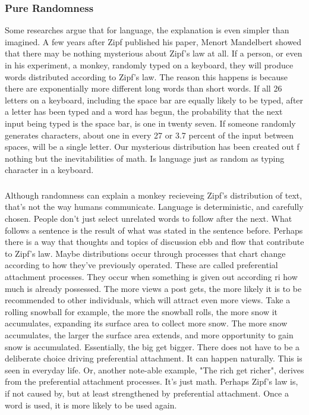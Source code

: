\documentclass[a4paper,10pt]{article}
\begin{document}
\subsubsection{Pure Randomness}

Some researches argue that for language, the explanation is even simpler than imagined. A few years after Zipf published his paper, Menort Mandelbert showed that there may be nothing mysterious about Zipf's law at all. If a person, or even in his experiment, a monkey, randomly typed on a keyboard, they will produce words distributed according to Zipf's law. The reason this happens is because there are exponentially more different long words than short words. If all 26 letters on a keyboard, including the space bar are equally likely to be typed, after a letter has been typed and a word has begun, the probability that the next input being typed is the space bar, is one in twenty seven.  If someone randomly generates  characters, about one in every 27 or 3.7 percent of the input between spaces, will be a single letter. Our mysterious distribution has been created out f nothing but the inevitabilities of math. Is language just as random as typing character in a keyboard. 


\subsubsection{}

Although randomness can explain a monkey recieveing Zipf's distribution of text, that's not the way humans communicate. Language is deterministic, and carefully chosen. People don't just select unrelated words to follow after the next. What follows a sentence is the result of what was stated in the sentence before. Perhaps there is a way that thoughts and topics of discussion ebb and flow that contribute to Zipf's law. Maybe distributions occur through processes that chart change according to how they've previously operated. These are called preferential attachment processes. They occur when something is given out according ri how much is already possessed. The more views a post gets, the more likely it is to be recommended to other individuals, which will attract even more views. Take a rolling snowball for example, the more the snowball rolls, the more snow it accumulates, expanding its surface area to collect more snow. The more snow accumulates, the larger the surface area extends, and more opportunity to gain snow is accumulated. Essentially, the big get bigger. There does not have to be a deliberate choice driving preferential attachment. It can happen naturally. This is seen in everyday life. Or, another note-able example, "The rich get richer", derives from the preferential attachment processes. It's just math. Perhaps Zipf's law is, if not caused by, but at least strengthened by preferential attachment. Once a word is used, it is more likely to be used again.
\end{document}
